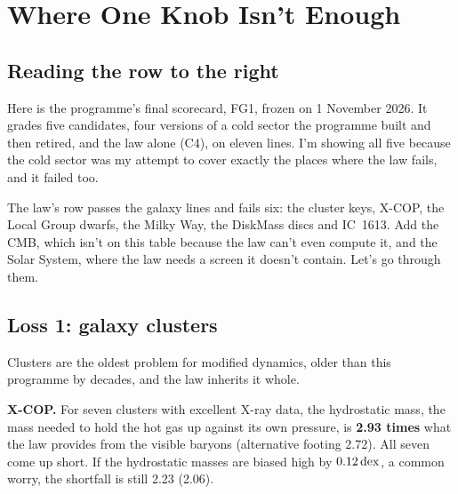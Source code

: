 \chapter{Where One Knob Isn't Enough}




\section{Reading the row to the right}

Here is the programme's final scorecard, FG1, frozen on 1 November 2026. It grades five candidates, four versions of a cold sector the programme built and then retired, and the law alone (C4), on eleven lines. I'm showing all five because the cold sector was my attempt to cover exactly the places where the law fails, and it failed too.


The law's row passes the galaxy lines and fails six: the cluster keys, X-COP, the Local Group dwarfs, the Milky Way, the DiskMass discs and IC~1613. Add the CMB, which isn't on this table because the law can't even compute it, and the Solar System, where the law needs a screen it doesn't contain. Let's go through them.

\section{Loss 1: galaxy clusters}

Clusters are the oldest problem for modified dynamics, older than this programme by decades, and the law inherits it whole.

\textbf{X-COP.} For seven clusters with excellent X-ray data, the hydrostatic mass, the mass needed to hold the hot gas up against its own pressure, is \textbf{2.93 times} what the law provides from the visible baryons (alternative footing 2.72). All seven come up short. If the hydrostatic masses are biased high by $0.12\,\mathrm{dex}$, a common worry, the shortfall is still 2.23 (2.06).

